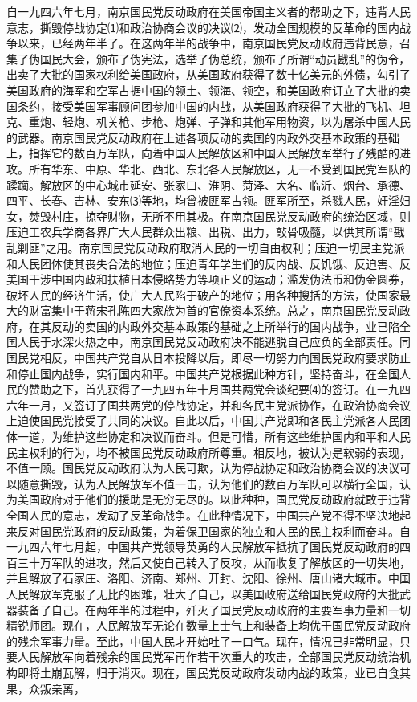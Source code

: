 \documentclass[UTF-8, a5paper, 12pt]{ctexart}
\begin{document}
自一九四六年七月，南京国民党反动政府在美国帝国主义者的帮助之下，违背人民意志，撕毁停战协定⑴和政治协商会议的决议⑵，发动全国规模的反革命的国内战争以来，已经两年半了。在这两年半的战争中，南京国民党反动政府违背民意，召集了伪国民大会，颁布了伪宪法，选举了伪总统，颁布了所谓“动员戡乱”的伪令，出卖了大批的国家权利给美国政府，从美国政府获得了数十亿美元的外债，勾引了美国政府的海军和空军占据中国的领土、领海、领空，和美国政府订立了大批的卖国条约，接受美国军事顾问团参加中国的内战，从美国政府获得了大批的飞机、坦克、重炮、轻炮、机关枪、步枪、炮弹、子弹和其他军用物资，以为屠杀中国人民的武器。南京国民党反动政府在上述各项反动的卖国的内政外交基本政策的基础上，指挥它的数百万军队，向着中国人民解放区和中国人民解放军举行了残酷的进攻。所有华东、中原、华北、西北、东北各人民解放区，无一不受到国民党军队的蹂躏。解放区的中心城市延安、张家口、淮阴、菏泽、大名、临沂、烟台、承德、四平、长春、吉林、安东⑶等地，均曾被匪军占领。匪军所至，杀戮人民，奸淫妇女，焚毁村庄，掠夺财物，无所不用其极。在南京国民党反动政府的统治区域，则压迫工农兵学商各界广大人民群众出粮、出税、出力，敲骨吸髓，以供其所谓“戡乱剿匪”之用。南京国民党反动政府取消人民的一切自由权利；压迫一切民主党派和人民团体使其丧失合法的地位；压迫青年学生们的反内战、反饥饿、反迫害、反美国干涉中国内政和扶植日本侵略势力等项正义的运动；滥发伪法币和伪金圆券，破坏人民的经济生活，使广大人民陷于破产的地位；用各种搜括的方法，使国家最大的财富集中于蒋宋孔陈四大家族为首的官僚资本系统。总之，南京国民党反动政府，在其反动的卖国的内政外交基本政策的基础之上所举行的国内战争，业已陷全国人民于水深火热之中，南京国民党反动政府决不能逃脱自己应负的全部责任。同国民党相反，中国共产党自从日本投降以后，即尽一切努力向国民党政府要求防止和停止国内战争，实行国内和平。中国共产党根据此种方针，坚持奋斗，在全国人民的赞助之下，首先获得了一九四五年十月国共两党会谈纪要⑷的签订。在一九四六年一月，又签订了国共两党的停战协定，并和各民主党派协作，在政治协商会议上迫使国民党接受了共同的决议。自此以后，中国共产党即和各民主党派各人民团体一道，为维护这些协定和决议而奋斗。但是可惜，所有这些维护国内和平和人民民主权利的行为，均不被国民党反动政府所尊重。相反地，被认为是软弱的表现，不值一顾。国民党反动政府认为人民可欺，认为停战协定和政治协商会议的决议可以随意撕毁，认为人民解放军不值一击，认为他们的数百万军队可以横行全国，认为美国政府对于他们的援助是无穷无尽的。以此种种，国民党反动政府就敢于违背全国人民的意志，发动了反革命战争。在此种情况下，中国共产党不得不坚决地起来反对国民党政府的反动政策，为着保卫国家的独立和人民的民主权利而奋斗。自一九四六年七月起，中国共产党领导英勇的人民解放军抵抗了国民党反动政府的四百三十万军队的进攻，然后又使自己转入了反攻，从而收复了解放区的一切失地，并且解放了石家庄、洛阳、济南、郑州、开封、沈阳、徐州、唐山诸大城市。中国人民解放军克服了无比的困难，壮大了自己，以美国政府送给国民党政府的大批武器装备了自己。在两年半的过程中，歼灭了国民党反动政府的主要军事力量和一切精锐师团。现在，人民解放军无论在数量上士气上和装备上均优于国民党反动政府的残余军事力量。至此，中国人民才开始吐了一口气。现在，情况已非常明显，只要人民解放军向着残余的国民党军再作若干次重大的攻击，全部国民党反动统治机构即将土崩瓦解，归于消灭。现在，国民党反动政府发动内战的政策，业已自食其果，众叛亲离，
\end{document}
